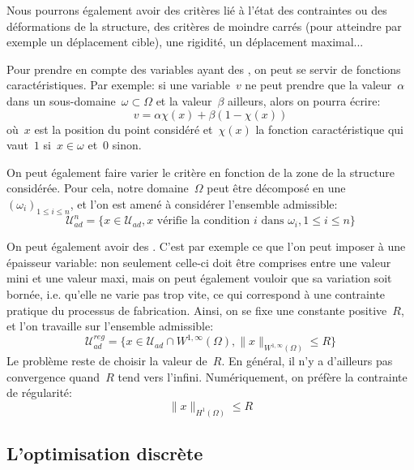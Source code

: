 Nous pourrons également avoir des critères lié à l'état des contraintes ou des déformations de la structure, des critères de moindre carrés (pour atteindre par exemple un déplacement cible), une rigidité, un déplacement maximal...

\medskip
Pour prendre en compte des variables ayant des , on peut se servir de fonctions caractéristiques.
Par  exemple: si une variable~$v$ ne peut prendre que la valeur~$\alpha$ dans un sous-domaine~$\omega\subset\Omega$ et la valeur~$\beta$ ailleurs, alors on pourra écrire:
\begin{equation}
v = \alpha \chi(x) + \beta(1-\chi(x))
\end{equation}
où~$x$ est la position du point considéré et~$\chi(x)$ la fonction caractéristique qui vaut~$1$ si~$x\in\omega$ et~$0$ sinon.

\medskip
On peut également faire varier le critère en fonction de la zone de la structure considérée.
Pour cela, notre domaine~$\Omega$ peut être décomposé en une ~$(\omega_i)_{1\le i\le n}$, et l'on est amené à considérer l'ensemble admissible:
\begin{equation}
\mathcal{U}^n_{ad}=\{ x\in \mathcal{U}_{ad}, x \text{ vérifie la condition } i \text{ dans } \omega_i, 1\le i\le n\}
\end{equation}

\medskip
On peut également avoir des . C'est par exemple ce que l'on peut imposer à une épaisseur variable: non seulement celle-ci doit être comprises entre une valeur mini et une valeur maxi, mais on peut également vouloir que sa variation soit bornée, i.e. qu'elle ne varie pas trop vite, ce qui correspond à une contrainte pratique du processus de fabrication.
Ainsi, on se fixe une constante positive~$R$, et l'on travaille sur l'ensemble admissible:
\begin{equation}
\mathcal{U}^{reg}_{ad}=\{ x\in \mathcal{U}_{ad} \cap W^{1,\infty}(\Omega), \|x\|_{W^{1,\infty}(\Omega)}\le R\}
\end{equation}
Le problème reste de choisir la valeur de~$R$. En général, il n'y a d'ailleurs pas convergence quand~$R$ tend vers l'infini.
Numériquement, on préfère la contrainte de régularité:
\begin{equation}
\|x\|_{H^1(\Omega)}\le R
\end{equation}

\medskip
\subsection{L'optimisation discrète}\label{Sec-OptDisc}

